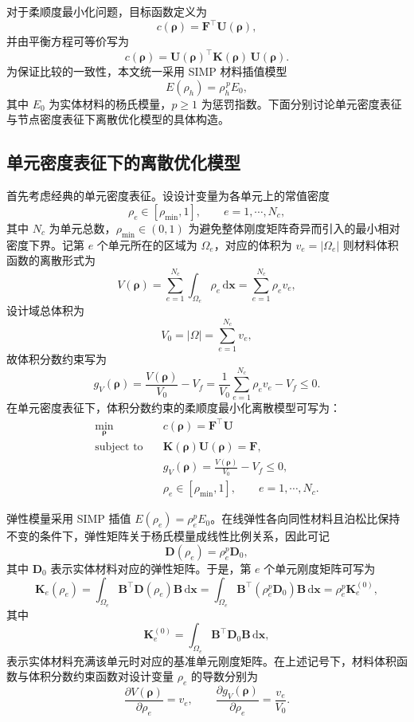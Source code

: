 对于柔顺度最小化问题，目标函数定义为
\[
c(\boldsymbol{\rho})=\boldsymbol{F}^{\top}\boldsymbol{U}(\boldsymbol{\rho}),
\]
并由平衡方程可等价写为
\[
c(\boldsymbol{\rho})=\boldsymbol{U}(\boldsymbol{\rho})^{\top}\boldsymbol{K}(\boldsymbol{\rho})\,\boldsymbol{U}(\boldsymbol{\rho}).
\]
为保证比较的一致性，本文统一采用 SIMP 材料插值模型
\[
E(\rho_h)=\rho_h^{\,p}E_0,
\]
其中 $E_0$ 为实体材料的杨氏模量，$p\ge 1$ 为惩罚指数。下面分别讨论单元密度表征与节点密度表征下离散优化模型的具体构造。


\subsection{单元密度表征下的离散优化模型}
\label{subsec:cell_density_rep}

首先考虑经典的单元密度表征。设设计变量为各单元上的常值密度
\[
\rho_e\in[\rho_{\min},1],\qquad e=1,\cdots,N_c,
\]
其中 $N_c$ 为单元总数，$\rho_{\min}\in(0,1)$ 为避免整体刚度矩阵奇异而引入的最小相对密度下界。记第 $e$ 个单元所在的区域为 $\Omega_e$，对应的体积为 $v_e=|\Omega_e|$ 则材料体积函数的离散形式为
\[
V(\boldsymbol{\rho})=\sum_{e=1}^{N_c}\int_{\Omega_e}\rho_e\,\mathrm{d}\boldsymbol{x} =\sum_{e=1}^{N_c}\rho_e v_e,
\]
设计域总体积为
\[
V_0=|\Omega|=\sum_{e=1}^{N_c}v_e,
\]
故体积分数约束写为
\[
g_V(\boldsymbol{\rho}) =\frac{V(\boldsymbol{\rho})}{V_0}-V_f =\frac{1}{V_0}\sum_{e=1}^{N_c}\rho_e v_e - V_f \le 0.
\]
在单元密度表征下，体积分数约束的柔顺度最小化离散模型可写为：
\begin{equation} \label{eq:ch3_discrete_model_cell}
	\begin{aligned} 
		\min_{\boldsymbol{\rho}}\quad & c(\boldsymbol{\rho})=\boldsymbol{F}^{\top}\boldsymbol{U}\\ 
		\text{subject to}\quad & \boldsymbol{K}(\boldsymbol{\rho})\boldsymbol{U}(\boldsymbol{\rho})=\boldsymbol{F},\\ 
		& g_V(\boldsymbol{\rho}) = \frac{V(\boldsymbol{\rho})}{V_0} - V_f \le 0,\\ 
		& \rho_e\in[\rho_{\min},1],\qquad e=1,\cdots,N_c. 
	\end{aligned}
\end{equation}

弹性模量采用 SIMP 插值 $E(\rho_e) = \rho_e^pE_0$。在线弹性各向同性材料且泊松比保持不变的条件下，弹性矩阵关于杨氏模量成线性比例关系，因此可记
\[
\boldsymbol D(\rho_e)=\rho_e^p\boldsymbol D_0,
\]
其中 $\boldsymbol D_0$ 表示实体材料对应的弹性矩阵。于是，第 $e$ 个单元刚度矩阵可写为
\[
\boldsymbol{K}_e(\rho_e) = \int_{\Omega_e}\boldsymbol{B}^{\top}\boldsymbol{D}(\rho_e)\boldsymbol{B}\,\mathrm{d}\boldsymbol{x} = \int_{\Omega_e}\boldsymbol{B}^{\top}(\rho_e^p\boldsymbol{D}_0)\boldsymbol{B}\,\mathrm{d}\boldsymbol{x} = \rho_e^p\boldsymbol{K}_e^{(0)},
\]
其中
\[
\boldsymbol K_e^{(0)}=\int_{\Omega_e}\boldsymbol B^{\top}\boldsymbol D_0\boldsymbol B\,\mathrm d\boldsymbol x,
\]
表示实体材料充满该单元时对应的基准单元刚度矩阵。在上述记号下，材料体积函数与体积分数约束函数对设计变量 $\rho_e$ 的导数分别为
\[
\frac{\partial V(\boldsymbol{\rho})}{\partial\rho_e}=v_e, \qquad \frac{\partial g_V(\boldsymbol{\rho})}{\partial\rho_e}=\frac{v_e}{V_0}.
\]

